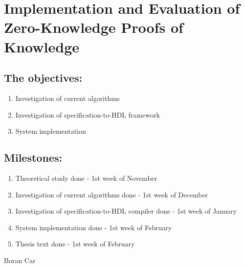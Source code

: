 \documentclass[12pt, a4paper]{article}
\begin{document}
  \section*{Implementation and Evaluation of Zero-Knowledge Proofs of Knowledge}

  \subsection*{The objectives:}
  \begin{enumerate}
    \item Investigation of current algorithms
    \item Investigation of specification-to-HDL framework
    \item System implementation
  \end{enumerate}

  \subsection*{Milestones:}
  \begin{enumerate}
    \item Theoretical study done - 1st week of November
    \item Investigation of current algorithms done - 1st week of December
    \item Investigation of specification-to-HDL compiler done - 1st week of January
    \item System implementation done - 1st week of February
    \item Thesis text done - 1st week of February
  \end{enumerate}

  \begin{gantt}{6}{6}
    \begin{ganttitle}
    \end{ganttitle}
  \end{gantt}

  \vfill
  \hfill \Large Boran Car
\end{document}
